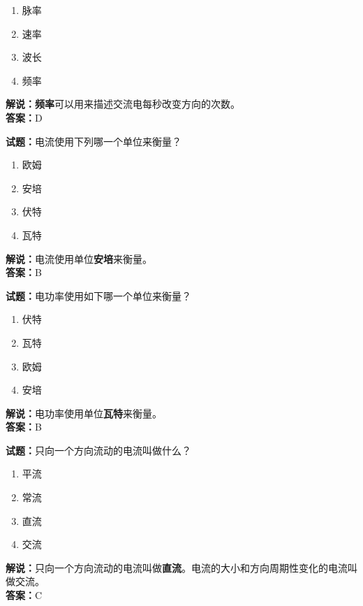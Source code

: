 \documentclass{ctexbook}
\begin{document}
\begin{enumerate}[leftmargin=3em]
	\item 脉率
	\item 速率
	\item 波长
	\item 频率
\end{enumerate}

\noindent\textbf{解说：}\textbf{频率}可以用来描述交流电每秒改变方向的次数。\\\noindent\textbf{答案：}D



\bigskip


\noindent\textbf{试题：}电流使用下列哪一个单位来衡量？

\begin{enumerate}[leftmargin=3em]
	\item 欧姆
	\item 安培
	\item 伏特
	\item 瓦特
\end{enumerate}

\noindent\textbf{解说：}电流使用单位\textbf{安培}来衡量。\\\noindent\textbf{答案：}B


\bigskip


\noindent\textbf{试题：}电功率使用如下哪一个单位来衡量？

\begin{enumerate}[leftmargin=3em]
	\item 伏特
	\item 瓦特
	\item 欧姆
	\item 安培
\end{enumerate}

\noindent\textbf{解说：}电功率使用单位\textbf{瓦特}来衡量。\\\noindent\textbf{答案：}B


\bigskip


\noindent\textbf{试题：}只向一个方向流动的电流叫做什么？

\begin{enumerate}[leftmargin=3em]
	\item 平流
	\item 常流
	\item 直流
	\item 交流
\end{enumerate}

\noindent\textbf{解说：}只向一个方向流动的电流叫做\textbf{直流}。电流的大小和方向周期性变化的电流叫做交流。\\\noindent\textbf{答案：}C
\end{document}
